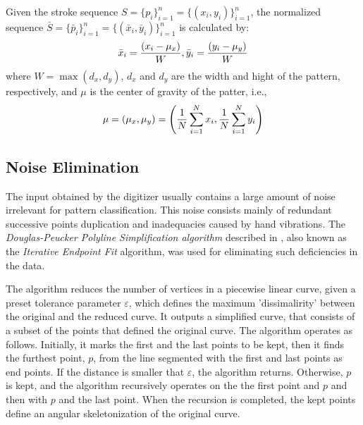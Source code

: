 \iftoggle{edit-mode}{\hspace{0pt}\marginpar{Approach}}{}
Given the stroke sequence $S=\{p_i\}_{i=1}^{n}=\{(x_i,y_i)\}_{i=1}^{n}$, the normalized sequence $\bar{S}=\{\bar p_i \}_{i=1}^{n}=\{(\bar x_i,\bar y_i)\}_{i=1}^{n}$ is calculated by: 
\begin{equation}
{\bar x_i} = {{\left( {{x_i} - {\mu _x}} \right)} \over W},{\bar y_i} = {{\left( {{y_i} - {\mu _y}} \right)} \over W}
\end{equation}
where $W = \max (d_x,d_y)$, $d_x$ and $d_y$ are the width and hight of the pattern, respectively, and $\mu$ is the center of gravity of the patter, i.e., 
\begin{equation}
\mu  = \left( {{\mu _x},{\mu _y}} \right) = \left( {{1 \over N}\sum\limits_{i = 1}^N {{x_i}} ,{1 \over N}\sum\limits_{i = 1}^N {{y_i}} } \right)
\end{equation}


\subsection{Noise Elimination}

\iftoggle{edit-mode}{\hspace{0pt}\marginpar{Introduction}}{}
The input obtained by the digitizer usually contains a large amount of noise irrelevant for pattern classification. 
This noise consists mainly of redundant successive points duplication and inadequacies caused by hand vibrations. 
The \emph{Douglas-Peucker Polyline Simplification algorithm} described in \cite{douglas1973algorithms}, also known as the \emph{Iterative Endpoint Fit} algorithm, was used for eliminating such deficiencies in the data. 

\iftoggle{edit-mode}{\hspace{0pt}\marginpar{The Douglas-Peucker algorithm}}{}
The algorithm reduces the number of vertices in a piecewise linear curve, given a preset tolerance parameter $\varepsilon$, which defines the maximum 'dissimalirity' between the original and the reduced curve.
It outputs a simplified curve, that consists of a subset of the points that defined the original curve.
The algorithm operates as follows. 
Initially, it marks the first and the last points to be kept, then it finds the furthest point, $p$, from the line segmented with the first and last points as end points.
If the distance is smaller that $\varepsilon$, the algorithm returns. 
Otherwise, $p$ is kept, and the algorithm recursively operates on the the first point and $p$ and then with $p$ and the last point.
When the recursion is completed, the kept points define an angular skeletonization of the original curve.

